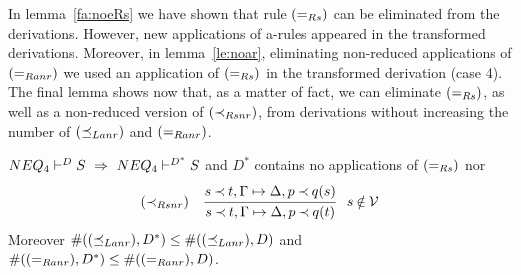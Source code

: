 \noindent
In lemma~\ref{fa:noeRs} we have shown that rule $(=_{Rs})$ can be eliminated from the
derivations. %
However, new applications of a-rules appeared in the transformed derivations. 
Moreover, in lemma~\ref{le:noar}, eliminating non-reduced
applications of $(=_{Ranr})$ we used an application of $(=_{Rs})$ in the transformed derivation
(case 4). The final lemma shows now that, as a matter of fact, we can eliminate $(=_{Rs})$, 
as well as a non-reduced version of $(\mathbin{\prec}_{Rsnr})$, from derivations without increasing the
number of $(\preceq_{Lanr})$ and $(=_{Ranr})$. 
\begin{LEMMA}\label{le:noiRsnr}
$\der{NEQ_{4}}DS\ \impl\ \der{NEQ_{4}}{D^{*}}S$ and $D^*$ contains no 
applications of $(=_{Rs})$ nor
\[
\iRsnr\ \ \ \mprule{s\Incl t,\GSD, p\Incl q(s)}{s\Incl t,\GSD,p\Incl q(t)}\ \ 
s\not\in\Vars
\]
Moreover $\#((\preceq_{Lanr}),D^*) \leq \#((\preceq_{Lanr}),D)$ and $\#((=_{Ranr}),D^*)\leq\#((=_{Ranr}),D)$.
\end{LEMMA}
